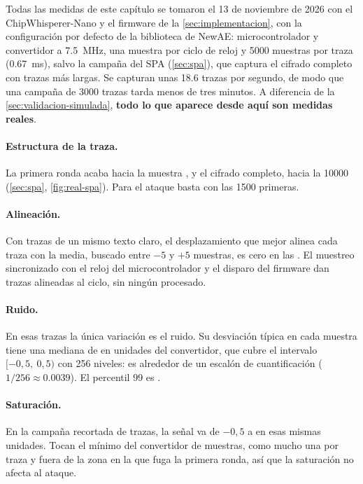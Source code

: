 Todas las medidas de este capítulo se tomaron el 13 de noviembre de 2026 con el
ChipWhisperer-Nano y el firmware de la \cref{sec:implementacion}, con la
configuración por defecto de la biblioteca de NewAE: microcontrolador y
convertidor a \qty{7,5}{\mega\hertz}, una muestra por ciclo de reloj y
\num{5000} muestras por traza (\qty{0,67}{\milli\second}), salvo la campaña del
SPA (\cref{sec:spa}), que captura el cifrado completo con trazas más largas. Se
capturan unas \num{18,6} trazas por segundo, de modo que una campaña de \num{3000} trazas
tarda menos de tres minutos. A diferencia de la \cref{sec:validacion-simulada},
\textbf{todo lo que aparece desde aquí son medidas reales}.

\paragraph{Estructura de la traza.} La primera ronda acaba hacia la muestra
\realRoundOneEnd, y el cifrado completo, hacia la \num{10000} (\cref{sec:spa},
\cref{fig:real-spa}). Para el ataque basta con las \num{1500} primeras.

\paragraph{Alineación.} Con \realFixedTextTraces{} trazas de un mismo texto
claro, el desplazamiento que mejor alinea cada traza con la media, buscado entre
$-5$ y $+5$ muestras, es cero en las \realAlignmentCentred. El muestreo
sincronizado con el reloj del microcontrolador y el disparo del firmware dan
trazas alineadas al ciclo, sin ningún procesado.

\paragraph{Ruido.} En esas \realFixedTextTraces{} trazas la única variación es
el ruido. Su desviación típica en cada muestra tiene una mediana de
\realNoiseMedian{} en unidades del convertidor, que cubre el intervalo
$[-0{,}5,\ 0{,}5)$ con 256 niveles: es alrededor de un escalón de cuantificación
($1/256 \approx \num{0,0039}$). El percentil 99 es \realNoiseTail.

\paragraph{Saturación.} En la campaña recortada de \realAttackTraces{} trazas,
la señal va de $-0{,}5$ a \realAdcMax{} en esas mismas unidades. Tocan el mínimo
del convertidor \realSaturatedSamples{} de \realTotalSamples{} muestras, como
mucho una por traza y fuera de la zona en la que fuga la primera ronda, así que
la saturación no afecta al ataque.

